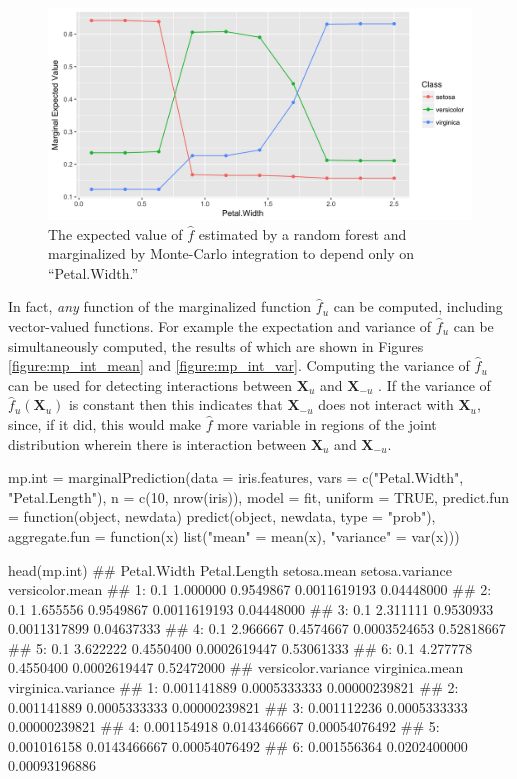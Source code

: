 \begin{figure}
  \includegraphics[width=\textwidth]{mp.png}
  \caption{The expected value of $\hat{f}$ estimated by a random forest and marginalized by Monte-Carlo integration to depend only on ``Petal.Width.'' \label{figure:mp}}
\end{figure}

In fact, \textit{any} function of the marginalized function $\hat{f}_u$ can be computed, including vector-valued functions. For example the expectation and variance of $\hat{f}_u$ can be simultaneously computed, the results of which are shown in Figures \ref{figure:mp_int_mean} and \ref{figure:mp_int_var}. Computing the variance of $\hat{f}_u$ can be used for detecting interactions between $\mathbf{X}_u$ and $\mathbf{X}_{-u}$ \citep{goldstein2015peeking}. If the variance of $\hat{f}_u(\mathbf{X}_u)$ is constant then this indicates that $\mathbf{X}_{-u}$ does not interact with $\mathbf{X}_u$, since, if it did, this would make $\hat{f}$ more variable in regions of the joint distribution wherein there is interaction between $\mathbf{X}_u$ and $\mathbf{X}_{-u}$.

\begin{example}
mp.int = marginalPrediction(data = iris.features,
  vars = c("Petal.Width", "Petal.Length"),
  n = c(10, nrow(iris)), model = fit, uniform = TRUE,
  predict.fun = function(object, newdata) predict(object, newdata, type = "prob"),
  aggregate.fun = function(x) list("mean" = mean(x), "variance" = var(x)))

head(mp.int)
##    Petal.Width Petal.Length setosa.mean setosa.variance versicolor.mean
## 1:         0.1     1.000000   0.9549867    0.0011619193      0.04448000
## 2:         0.1     1.655556   0.9549867    0.0011619193      0.04448000
## 3:         0.1     2.311111   0.9530933    0.0011317899      0.04637333
## 4:         0.1     2.966667   0.4574667    0.0003524653      0.52818667
## 5:         0.1     3.622222   0.4550400    0.0002619447      0.53061333
## 6:         0.1     4.277778   0.4550400    0.0002619447      0.52472000
##    versicolor.variance virginica.mean virginica.variance
## 1:         0.001141889   0.0005333333      0.00000239821
## 2:         0.001141889   0.0005333333      0.00000239821
## 3:         0.001112236   0.0005333333      0.00000239821
## 4:         0.001154918   0.0143466667      0.00054076492
## 5:         0.001016158   0.0143466667      0.00054076492
## 6:         0.001556364   0.0202400000      0.00093196886  
\end{example}

